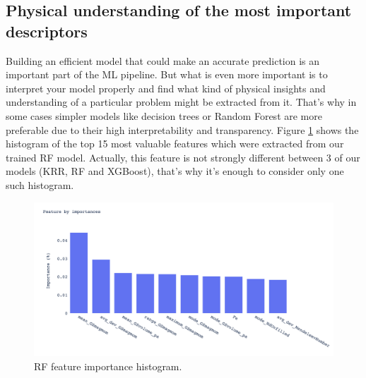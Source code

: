 \subsection{Physical understanding of the most important descriptors}

Building an efficient model that could make an accurate prediction is an important part of the ML pipeline. But what is even more important is to interpret your model properly and find what kind of physical insights and understanding of a particular problem might be extracted from it. That's why in some cases simpler models like decision trees or Random Forest are more preferable due to their high interpretability and transparency.
Figure \ref{fig:rf_features} shows the histogram of the top 15 most valuable features which were extracted from our trained RF model. Actually, this feature is not strongly different between 3 of our models (KRR, RF and XGBoost), that's why it's enough to consider only one such histogram.

\begin{figure}[H]
	\centering
	\includegraphics[width=160mm]{fig/ml_fig/rf_features.png}
	\caption[RF feature importance histogram.]{RF feature importance histogram.}
\label{fig:rf_features}
\end{figure}

